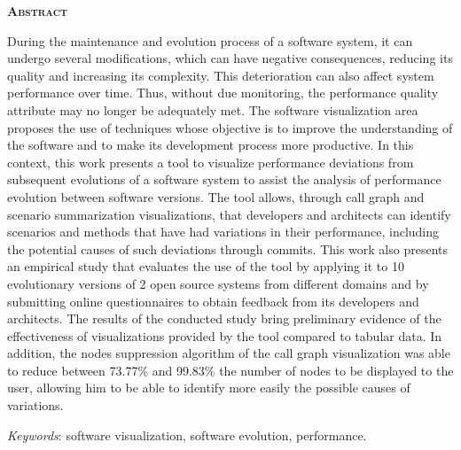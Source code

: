\begin{center}
	{\Large{\textbf{\mscThesisEnglishTitle}}}
\end{center}

\vspace{1cm}


\vspace{1cm}

\begin{center}
	\Large{\textsc{\textbf{Abstract}}}
\end{center}

\noindent During the maintenance and evolution process of a software system, it can undergo several modifications, which can have negative consequences, reducing its quality and increasing its complexity. This deterioration can also affect system performance over time. Thus, without due monitoring, the performance quality attribute may no longer be adequately met. The software visualization area proposes the use of techniques whose objective is to improve the understanding of the software and to make its development process more productive. In this context, this work presents a tool to visualize performance deviations from subsequent evolutions of a software system to assist the analysis of performance evolution between software versions. The tool allows, through call graph and scenario summarization visualizations, that developers and architects can identify scenarios and methods that have had variations in their performance, including the potential causes of such deviations through commits. This work also presents an empirical study that evaluates the use of the tool by applying it to 10 evolutionary versions of 2 open source systems from different domains and by submitting online questionnaires to obtain feedback from its developers and architects. The results of the conducted study bring preliminary evidence of the effectiveness of visualizations provided by the tool compared to tabular data. In addition, the nodes suppression algorithm of the call graph visualization was able to reduce between 73.77\% and 99.83\% the number of nodes to be displayed to the user, allowing him to be able to identify more easily the possible causes of variations.

\noindent\textit{Keywords}: software visualization, software evolution, performance.